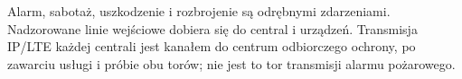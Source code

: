 Alarm, sabotaż, uszkodzenie i rozbrojenie są odrębnymi zdarzeniami. Nadzorowane linie wejściowe dobiera się do central i urządzeń. Transmisja IP/LTE każdej centrali jest kanałem do centrum odbiorczego ochrony, po zawarciu usługi i próbie obu torów; nie jest to tor transmisji alarmu pożarowego.

